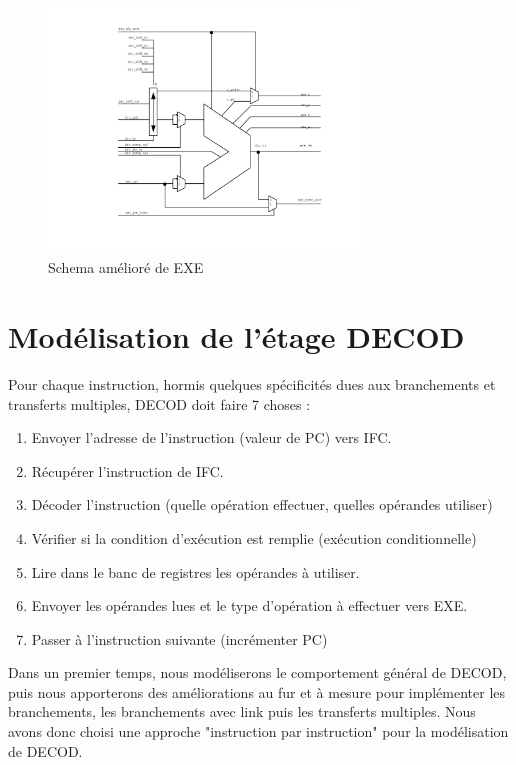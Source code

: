 \documentclass{article}
\begin{document}
\begin{figure}[H]
\includegraphics[width=0.75\textwidth]{pics/exe.png}
\centering
\caption{Schema amélioré de EXE}
\label{exe}
\end{figure}

\section{Modélisation de l'étage DECOD}

Pour chaque instruction, hormis quelques spécificités dues aux branchements
et transferts multiples, DECOD doit faire 7 choses :
\begin{enumerate}
  \item Envoyer l'adresse de l'instruction (valeur de PC) vers IFC.
  \item Récupérer l'instruction de IFC.
  \item Décoder l'instruction (quelle opération effectuer, quelles opérandes utiliser)
  \item Vérifier si la condition d'exécution est remplie (exécution conditionnelle)
  \item Lire dans le banc de registres les opérandes à utiliser.
  \item Envoyer les opérandes lues et le type d'opération à effectuer vers EXE.
  \item Passer à l'instruction suivante (incrémenter PC)
\end{enumerate}

Dans un premier temps, nous modéliserons le comportement général de DECOD,
puis nous apporterons des améliorations au fur et à mesure pour implémenter les branchements,
les branchements avec link puis les transferts multiples. Nous avons donc choisi une approche
"instruction par instruction" pour la modélisation de DECOD.
\end{document}
